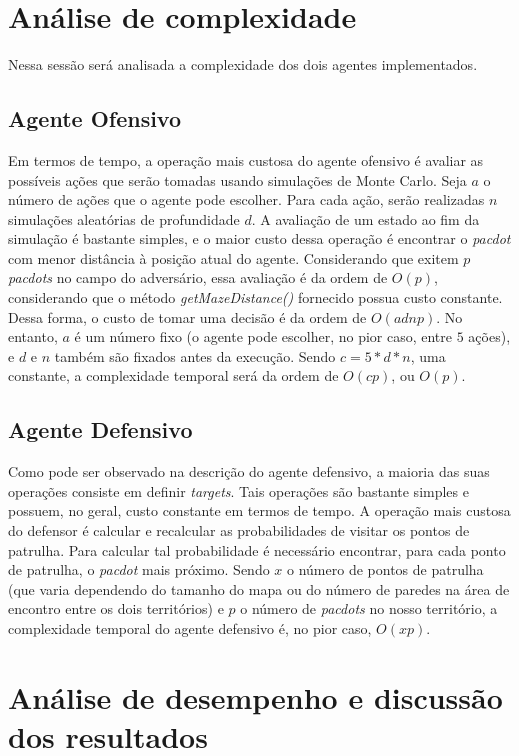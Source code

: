 \documentclass[a4paper,12pt]{article}
\begin{document}
\section{Análise de complexidade}
Nessa sessão será analisada a complexidade dos dois agentes implementados.

\subsection{Agente Ofensivo}
Em termos de tempo, a operação mais custosa do agente ofensivo é avaliar as possíveis ações
que serão tomadas usando simulações de Monte Carlo. Seja $a$ o número de ações
que o agente pode escolher. Para cada ação, serão realizadas $n$ simulações
aleatórias de profundidade $d$. A avaliação de um estado ao fim da simulação
é bastante simples, e o maior custo dessa operação é encontrar o \textit{pacdot}
com menor distância à posição atual do agente. Considerando que exitem $p$
\textit{pacdots} no campo do adversário, essa avaliação é da ordem de $O(p)$,
considerando que o método \textit{getMazeDistance()} fornecido possua custo
constante. Dessa forma, o custo de tomar uma decisão é da ordem de $O(adnp)$.
No entanto, $a$ é um número fixo (o agente pode escolher, no pior caso, entre $5$ ações), e
$d$ e $n$ também são fixados antes da execução. Sendo $c = 5 * d * n$, uma constante,
a complexidade temporal será da ordem de $O(cp)$, ou $O(p)$.


\subsection{Agente Defensivo}
Como pode ser observado na descrição do agente defensivo, a maioria das suas
operações consiste em definir \textit{targets}. Tais operações são bastante
simples e possuem, no geral, custo constante em termos de tempo. A operação mais custosa do defensor
é calcular e recalcular as probabilidades de visitar os pontos de patrulha. Para calcular tal
probabilidade é necessário encontrar, para cada ponto de patrulha, o \textit{pacdot} mais próximo.
Sendo $x$ o número de pontos de patrulha (que varia dependendo do tamanho do mapa ou do número
de paredes na área de encontro entre os dois territórios) e $p$ o número de \textit{pacdots}
no nosso território, a complexidade temporal do agente defensivo é, no pior caso, $O(xp)$.

\section{Análise de desempenho e discussão dos resultados}
\end{document}
